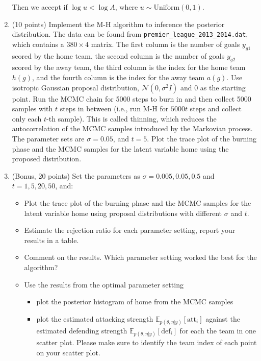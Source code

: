 \documentclass{article}
\begin{document}
\begin{enumerate}
Then we accept if $\log u < \log A$, where $u \sim \text{Uniform}(0, 1)$.
\item (10 points) Implement the M-H algorithm to inference the posterior distribution. The data can be found
from \texttt{premier\_league\_2013\_2014.dat}, which contains a $380 \times 4$ matrix. The first column is the number
of goals $y_{g1}$ scored by the home team, the second column is the number of goals $y_{g2}$ scored by the away
team, the third column is the index for the home team $h(g)$, and the fourth column is the index for the
away team $a(g)$. Use isotropic Gaussian proposal distribution, $\mathcal{N}(0, \sigma^2I)$ and 0 as the starting point.
Run the MCMC chain for 5000 steps to burn in and then collect 5000 samples with $t$ steps in between
(i.e., run M-H for $5000t$ steps and collect only each $t$-th sample). This is called thinning, which reduces
the autocorrelation of the MCMC samples introduced by the Markovian process. The parameter sets
are $\sigma = 0.05$, and $t = 5$. Plot the trace plot of the burning phase and the MCMC samples for the latent
variable home using the proposed distribution.

\item (Bonus, 20 points) Set the parameters as $\sigma = 0.005, 0.05, 0.5$ and $t = 1, 5, 20, 50$, and:
\begin{itemize}
\item Plot the trace plot of the burning phase and the MCMC samples for the latent variable home using
proposal distributions with different $\sigma$ and $t$.
\item Estimate the rejection ratio for each parameter setting, report your results in a table.
\item Comment on the results. Which parameter setting worked the best for the algorithm?
\item Use the results from the optimal parameter setting
\begin{itemize}
\item plot the posterior histogram of home from the MCMC samples
\item plot the estimated attacking strength $\mathbb{E}_{p(\theta,\eta|y)}[\text{att}_i]$ against the estimated defending strength
$\mathbb{E}_{p(\theta,\eta|y)}[\text{def}_i]$ for each the team in one scatter plot. Please make sure to identify the team
index of each point on your scatter plot.
\end{itemize}
\end{itemize}
\end{enumerate}
\end{document}
